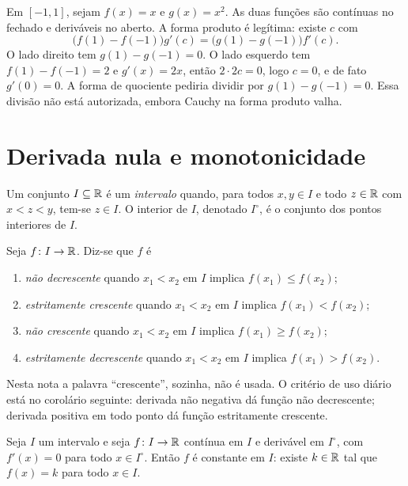 \documentclass[11pt,a4paper]{article}
\begin{document}
\begin{contraexemplo}
Em $[-1,1]$, sejam $f(x)=x$ e $g(x)=x^2$. As duas funções são contínuas no fechado e deriváveis no aberto. A forma produto é legítima: existe $c$ com
\[
\bigl(f(1)-f(-1)\bigr)g'(c)=\bigl(g(1)-g(-1)\bigr)f'(c).
\]
O lado direito tem $g(1)-g(-1)=0$. O lado esquerdo tem $f(1)-f(-1)=2$ e $g'(x)=2x$, então $2\cdot 2c=0$, logo $c=0$, e de fato $g'(0)=0$. A forma de quociente pediria dividir por $g(1)-g(-1)=0$. Essa divisão não está autorizada, embora Cauchy na forma produto valha.
\end{contraexemplo}


\section{Derivada nula e monotonicidade}

\begin{definicao}
Um conjunto $I\subseteq\mathbb{R}$ é um \emph{intervalo} quando, para todos $x,y\in I$ e todo $z\in\mathbb{R}$ com $x<z<y$, tem-se $z\in I$. O interior de $I$, denotado $I^\circ$, é o conjunto dos pontos interiores de $I$.

Seja $f\colon I\to\mathbb{R}$. Diz-se que $f$ é
\begin{enumerate}
\item \emph{não decrescente} quando $x_1<x_2$ em $I$ implica $f(x_1)\le f(x_2)$;
\item \emph{estritamente crescente} quando $x_1<x_2$ em $I$ implica $f(x_1)<f(x_2)$;
\item \emph{não crescente} quando $x_1<x_2$ em $I$ implica $f(x_1)\ge f(x_2)$;
\item \emph{estritamente decrescente} quando $x_1<x_2$ em $I$ implica $f(x_1)>f(x_2)$.
\end{enumerate}
Nesta nota a palavra ``crescente'', sozinha, não é usada. O critério de uso diário está no corolário seguinte: derivada não negativa dá função não decrescente; derivada positiva em todo ponto dá função estritamente crescente.
\end{definicao}

\begin{corolario}\label{cor:derivada-nula}
Seja $I$ um intervalo e seja $f\colon I\to\mathbb{R}$ contínua em $I$ e derivável em $I^\circ$, com $f'(x)=0$ para todo $x\in I^\circ$. Então $f$ é constante em $I$: existe $k\in\mathbb{R}$ tal que $f(x)=k$ para todo $x\in I$.
\end{corolario}
\end{document}
